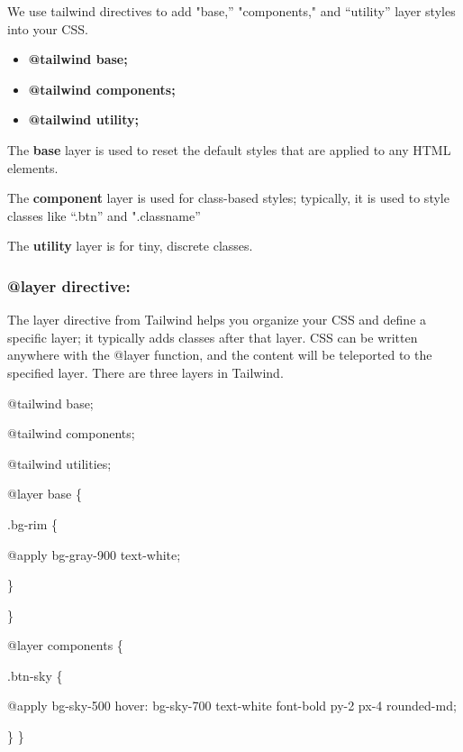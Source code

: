 \documentclass[conference]{IEEEtran}
\begin{document}
We use tailwind directives to add "base,'' "components," and ``utility''
layer styles into your CSS.

\begin{itemize}
    \item \textbf{@tailwind base;}
\end{itemize}
\begin{itemize}
    \item \textbf{@tailwind components;}
\end{itemize}
\begin{itemize}
    \item \textbf{@tailwind utility;}
\end{itemize}

The \textbf{base} layer is used to reset the default styles that are
applied to any HTML elements.

The \textbf{component} layer is used for class-based styles; typically,
it is used to style classes like ``.btn'' and ".classname''

The \textbf{utility} layer is for tiny, discrete classes.

\hypertarget{layer-directive}{%
\subsubsection{\texorpdfstring{\textbf{@layer
directive:}}{@layer directive:}}\label{layer-directive}}

The layer directive from Tailwind helps you organize your CSS and define a specific layer; it typically adds classes after that layer. CSS can be written anywhere with the @layer function, and the content will be teleported to the specified layer. There are three layers in Tailwind.

@tailwind base;

@tailwind components;

@tailwind utilities;
\newline

@layer base \{

.bg-rim \{

@apply bg-gray-900 text-white;

    \}

\}

@layer components \{

.btn-sky \{

@apply bg-sky-500 hover: bg-sky-700 text-white font-bold py-2 px-4 rounded-md;

\}  
\}
\end{document}
